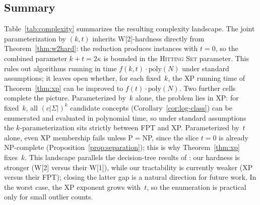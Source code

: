 \documentclass[accepted]{uai2026} %
\theoremstyle{definition}
\theoremstyle{remark}
\newcommand{\AF}{\textsc{ApxFit}}
\newcommand{\poly}{\mathrm{poly}}
\begin{document}
\subsection{Summary}\label{sec:complexity:summary}

Table~\ref{tab:complexity} summarizes the
resulting complexity landscape.
The joint parameterization by
$(k, t)$ inherits W[2]-hardness directly from
Theorem~\ref{thm:w2hard}: the reduction produces instances with
$t = 0$, so the combined parameter $k + t = 2\kappa$ is bounded in
the \textsc{Hitting Set} parameter. This rules out algorithms
running in time $f(k,t) \cdot \poly(N)$ under standard
assumptions; it leaves open whether, for each fixed~$k$, the XP
running time of Theorem~\ref{thm:xp} can be improved to
$f(t) \cdot \poly(N)$.
Two further cells complete the picture.
Parameterized by~$k$ alone, the problem lies in XP: for
fixed~$k$, all $(c|\Sigma|)^k$ candidate concepts
(Corollary~\ref{cor:log-class}) can be enumerated and evaluated
in polynomial time, so under standard assumptions the
$k$-parameterization sits strictly between FPT and XP.
Parameterized by~$t$ alone, even XP membership fails unless
P${}={}$NP, since the slice $t = 0$ is already NP-complete
(Proposition~\ref{prop:separation}); this is why
Theorem~\ref{thm:xp} fixes~$k$.
This landscape parallels the decision-tree
results of \citet{DBLP:conf/aaai/GahlawatZ24}: our hardness is
stronger (W[2] versus their W[1]), while our tractability is
currently weaker (XP versus their FPT); closing the latter gap is
a natural direction for future work.
In the worst case, the XP exponent grows
with~$t$, so the enumeration is practical only for small outlier
counts.

\begin{table}[ht]
  \centering
  \caption{Parameterized complexity of $\AF(k,t)$.
  Hardness entries assume
  $\{\sqcap, \exists\} \subseteq O$ or
  $\{\sqcup, \forall\} \subseteq O$; membership entries hold for
  every operator set.}\label{tab:complexity}
  \small
\end{table}
\end{document}
